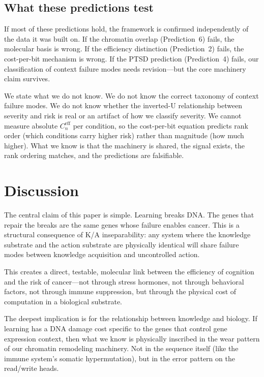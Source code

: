 \documentclass[11pt]{article}
\theoremstyle{definition}
\begin{document}
\subsection{What these predictions test}

If most of these predictions hold, the framework is confirmed
independently of the data it was built on. If the chromatin
overlap (Prediction~6) fails, the molecular basis is wrong.
If the efficiency distinction (Prediction~2) fails, the
cost-per-bit mechanism is wrong. If the PTSD prediction
(Prediction~4) fails, our classification of context failure
modes needs revision---but the core machinery claim survives.

We state what we do not know. We do not know the correct
taxonomy of context failure modes. We do not know whether the
inverted-U relationship between severity and risk is real or an
artifact of how we classify severity. We cannot measure absolute
$C_n^{\text{eff}}$ per condition, so the cost-per-bit equation
predicts rank order (which conditions carry higher risk) rather
than magnitude (how much higher). What we know is that the
machinery is shared, the signal exists, the rank ordering matches,
and the predictions are falsifiable.

\section{Discussion}
\label{sec:discussion}

The central claim of this paper is simple. Learning breaks DNA.
The genes that repair the breaks are the same genes whose failure
enables cancer. This is a structural consequence of K/A
inseparability: any system where the knowledge substrate and the
action substrate are physically identical will share failure modes
between knowledge acquisition and uncontrolled action.

This creates a direct, testable, molecular link between the
efficiency of cognition and the risk of cancer---not through stress
hormones, not through behavioral factors, not through immune
suppression, but through the physical cost of computation in a
biological substrate.

The deepest implication is for the relationship between knowledge
and biology. If learning has a DNA damage cost specific to the
genes that control gene expression context, then what we know is
physically inscribed in the wear pattern of our chromatin
remodeling machinery. Not in the sequence itself (like the immune
system's somatic hypermutation), but in the error pattern on the
read/write heads.
\end{document}
